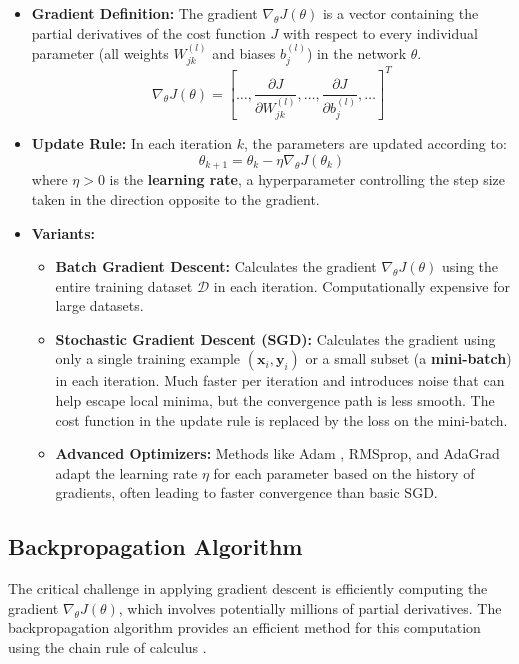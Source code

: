 \documentclass[11pt,twoside,openright]{report}
\begin{document}
\begin{itemize}
    \item \textbf{Gradient Definition:} The gradient $\nabla_\theta J(\theta)$ is a vector containing the partial derivatives of the cost function $J$ with respect to every individual parameter (all weights $W_{jk}^{(l)}$ and biases $b_j^{(l)}$) in the network $\theta$.
        $$ \nabla_\theta J(\theta) = \left[ \dots, \frac{\partial J}{\partial W_{jk}^{(l)}}, \dots, \frac{\partial J}{\partial b_j^{(l)}}, \dots \right]^T $$

    \item \textbf{Update Rule:} In each iteration $k$, the parameters are updated according to:
        \begin{equation} \label{eq:gd_update}
            \theta_{k+1} = \theta_k - \eta \nabla_\theta J(\theta_k)
        \end{equation}
        where $\eta > 0$ is the \textbf{learning rate}, a hyperparameter controlling the step size taken in the direction opposite to the gradient.

    \item \textbf{Variants:}
        \begin{itemize}
            \item \textbf{Batch Gradient Descent:} Calculates the gradient $\nabla_\theta J(\theta)$ using the entire training dataset $\mathcal{D}$ in each iteration. Computationally expensive for large datasets.
            \item \textbf{Stochastic Gradient Descent (SGD):} Calculates the gradient using only a single training example $(\mathbf{x}_i, \mathbf{y}_i)$ or a small subset (a \textbf{mini-batch}) in each iteration. Much faster per iteration and introduces noise that can help escape local minima, but the convergence path is less smooth. The cost function in the update rule is replaced by the loss on the mini-batch.
            \item \textbf{Advanced Optimizers:} Methods like Adam \cite{kingma2014adam}, RMSprop, and AdaGrad adapt the learning rate $\eta$ for each parameter based on the history of gradients, often leading to faster convergence than basic SGD.
        \end{itemize}
\end{itemize}

\subsection{Backpropagation Algorithm}
The critical challenge in applying gradient descent is efficiently computing the gradient $\nabla_\theta J(\theta)$, which involves potentially millions of partial derivatives. The backpropagation algorithm provides an efficient method for this computation using the chain rule of calculus \cite{rumelhart1986learning}.
\end{document}
